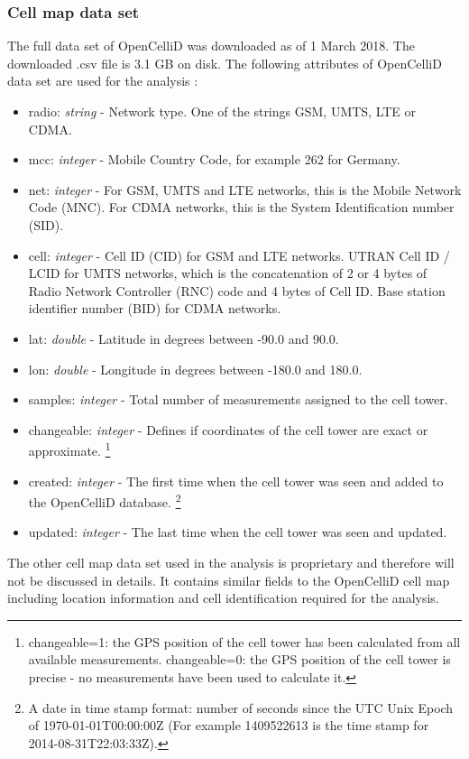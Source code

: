 \subsubsection{Cell map data set}
The full data set of OpenCelliD was downloaded as of 1 March 2018. The downloaded .csv file is 3.1 GB on disk. The following attributes of OpenCelliD data set are used for the analysis \cite{opencellid}:
\begin{itemize}
\item radio: \textit{string} - Network type. One of the strings GSM, UMTS, LTE or CDMA.
\item mcc:  \textit{integer}  -  Mobile Country Code, for example 262 for Germany.
\item net: \textit{integer} - For GSM, UMTS and LTE networks, this is the Mobile Network Code (MNC). For CDMA networks, this is the System Identification number (SID).
\item cell: \textit{integer} - Cell ID (CID) for GSM and LTE networks. UTRAN Cell ID / LCID for UMTS networks, which is the concatenation of 2 or 4 bytes of Radio Network Controller (RNC) code and 4 bytes of Cell ID. Base station identifier number (BID) for CDMA networks.
\item lat: \textit{double} - Latitude in degrees between -90.0 and 90.0.
\item lon: \textit{double} - Longitude in degrees between -180.0 and 180.0.
\item samples: \textit{integer} - Total number of measurements assigned to the cell tower.
\item changeable:  \textit{integer} - Defines if coordinates of the cell tower are exact or approximate. \footnote{changeable=1: the GPS position of the cell tower has been calculated from all available measurements. changeable=0: the GPS position of the cell tower is precise - no measurements have been used to calculate it.}
\item created: \textit{integer} - The first time when the cell tower was seen and added to the OpenCelliD database. \footnote{A date in time stamp format: number of seconds since the UTC Unix Epoch of 1970-01-01T00:00:00Z (For example 1409522613 is the time stamp for 2014-08-31T22:03:33Z).}
\item updated: \textit{integer} - The last time when the cell tower was seen and updated.
\end{itemize}

The other cell map data set  used in the analysis is proprietary and therefore will not be discussed in details. It contains similar fields to the OpenCelliD cell map including location information and cell identification required for the analysis.

